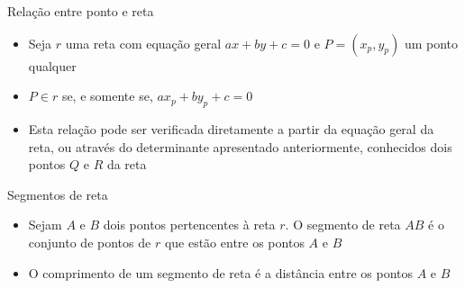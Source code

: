 \begin{frame}[fragile]{Relação entre ponto e reta}

    \begin{itemize}
        \item Seja $r$ uma reta com equação geral $ax + by + c = 0$ e $P = (x_p, y_p)$ um ponto qualquer
        \pause

        \item $P\in r$ se, e somente se, $ax_p + by_p + c = 0$
        \pause


        \item Esta relação pode ser verificada diretamente a partir da equação geral da reta, ou através do determinante apresentado anteriormente, conhecidos dois pontos $Q$ e $R$ da reta
        \pause


    \end{itemize}

\end{frame}

\begin{frame}[fragile]{Segmentos de reta}

    \begin{itemize}
        \item Sejam $A$ e $B$ dois pontos pertencentes à reta $r$. O segmento de reta $AB$ é o conjunto de pontos de $r$ que estão entre os pontos $A$ e $B$
        \pause

        \item O comprimento de um segmento de reta é a distância entre os pontos $A$ e $B$
        \pause
    \end{itemize}

    \begin{center}
    \end{center}

\end{frame}

